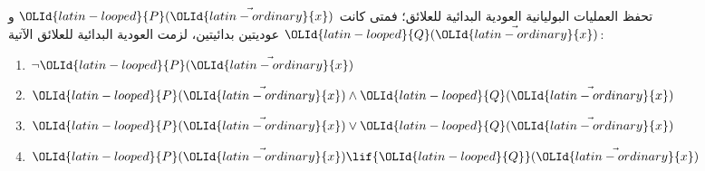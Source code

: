 \documentclass[../../../include/open-logic-section]{subfiles}
\begin{document}
\begin{prop}
  تحفظ العمليات البوليانية العودية البدائية للعلائق؛ فمتى
  كانت ${\OLId{latin-looped}{P}}(\vec {\OLId{latin-ordinary}{x}})$ و${\OLId{latin-looped}{Q}}(\vec {\OLId{latin-ordinary}{x}})$ عوديتين بدائيتين، لزمت العودية البدائية
  للعلائق الآتية:
  \begin{enumerate}
  \item $\lnot {\OLId{latin-looped}{P}}(\vec {\OLId{latin-ordinary}{x}})$
  \item ${\OLId{latin-looped}{P}}(\vec {\OLId{latin-ordinary}{x}}) \land {\OLId{latin-looped}{Q}}(\vec {\OLId{latin-ordinary}{x}})$
  \item ${\OLId{latin-looped}{P}}(\vec {\OLId{latin-ordinary}{x}}) \lor {\OLId{latin-looped}{Q}}(\vec {\OLId{latin-ordinary}{x}})$
  \item ${\OLId{latin-looped}{P}}(\vec {\OLId{latin-ordinary}{x}}) \lif {\OLId{latin-looped}{Q}}(\vec {\OLId{latin-ordinary}{x}})$
  \end{enumerate}
\end{prop}
\end{document}
